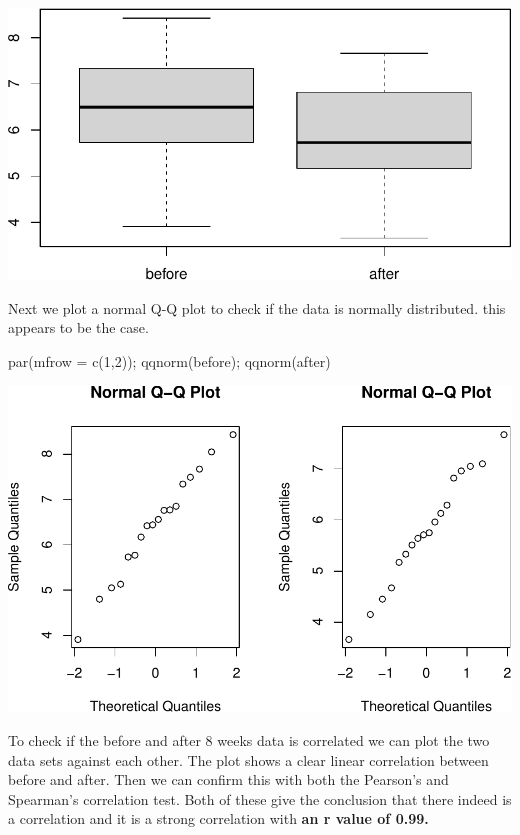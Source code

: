 \documentclass[
]{article}
\newenvironment{Shaded}{\begin{snugshade}}{\end{snugshade}}
\newcommand{\AttributeTok}[1]{\textcolor[rgb]{0.77,0.63,0.00}{#1}}
\newcommand{\DecValTok}[1]{\textcolor[rgb]{0.00,0.00,0.81}{#1}}
\newcommand{\FunctionTok}[1]{\textcolor[rgb]{0.00,0.00,0.00}{#1}}
\newcommand{\NormalTok}[1]{#1}
\begin{document}
\includegraphics{assignment_1_files/figure-latex/unnamed-chunk-11-1.pdf}

Next we plot a normal Q-Q plot to check if the data is normally
distributed. this appears to be the case.

\begin{Shaded}
\begin{Highlighting}[]
\FunctionTok{par}\NormalTok{(}\AttributeTok{mfrow =} \FunctionTok{c}\NormalTok{(}\DecValTok{1}\NormalTok{,}\DecValTok{2}\NormalTok{)); }\FunctionTok{qqnorm}\NormalTok{(before); }\FunctionTok{qqnorm}\NormalTok{(after)}
\end{Highlighting}
\end{Shaded}

\includegraphics{assignment_1_files/figure-latex/unnamed-chunk-12-1.pdf}

To check if the before and after 8 weeks data is correlated we can plot
the two data sets against each other. The plot shows a clear linear
correlation between before and after. Then we can confirm this with both
the Pearson's and Spearman's correlation test. Both of these give the
conclusion that there indeed is a correlation and it is a strong
correlation with \textbf{an r value of 0.99.}
\end{document}
